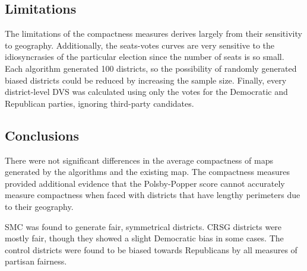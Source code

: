 \subsection{Limitations}

The limitations of the compactness measures derives largely from their sensitivity to geography. Additionally, the seats-votes curves are very sensitive to the idiosyncrasies of the particular election since the number of seats is so small. Each algorithm generated 100 districts, so the possibility of randomly generated biased districts could be reduced by increasing the sample size. Finally, every district-level DVS was calculated using only the votes for the Democratic and Republican parties, ignoring third-party candidates.

\subsection{Conclusions}

There were not significant differences in the average compactness of maps generated by the algorithms and the existing map. The compactness measures provided additional evidence that the Polsby-Popper score cannot accurately measure compactness when faced with districts that have lengthy perimeters due to their geography. 

SMC was found to generate fair, symmetrical districts. CRSG districts were mostly fair, though they showed a slight Democratic bias in some cases. The control districts were found to be biased towards Republicans by all measures of partisan fairness. 